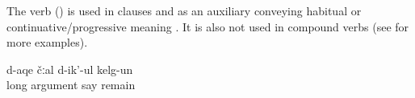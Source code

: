The verb  ()  is used in  clauses and as an auxiliary conveying habitual or continuative\slash progressive meaning . It is also not used in compound verbs (see  for more examples).

\begin{exe}
	\ex	\label{ex:‎‎They were arguing for a long time}
	\gll	d-aqe	čːal	d-ik'-ul	kelg-un\\
		long	argument	say	remain\\
	\glt	{}
\end{exe}

